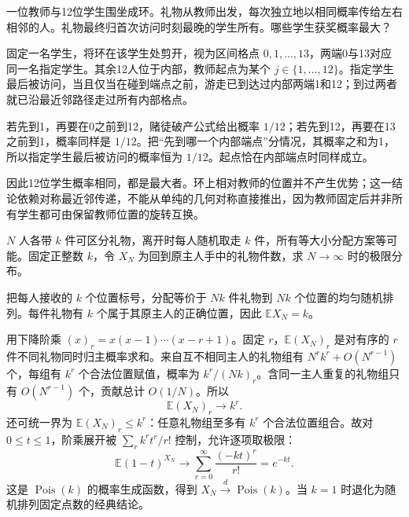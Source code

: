 \documentclass[UTF8,12pt,a4paper,fontset=fandol]{ctexbook}
\newcommand{\E}{\mathbb E}
\begin{document}
\begin{example}[原题2：圆周游走中最后被访问的人]\label{yau:2018-2}
一位教师与12位学生围坐成环。礼物从教师出发，每次独立地以相同概率传给左右相邻的人。礼物最终归首次访问时刻最晚的学生所有。哪些学生获奖概率最大？
\end{example}
\begin{solve}
固定一名学生，将环在该学生处剪开，视为区间格点 $0,1,\ldots,13$，两端0与13对应同一名指定学生。其余12人位于内部，教师起点为某个 $j\in\{1,\ldots,12\}$。指定学生最后被访问，当且仅当在碰到端点之前，游走已到达过内部两端1和12；到过两者就已沿最近邻路径走过所有内部格点。

若先到1，再要在0之前到12，赌徒破产公式给出概率 $1/12$；若先到12，再要在13之前到1，概率同样是 $1/12$。把“先到哪一个内部端点”分情况，其概率之和为1，所以指定学生最后被访问的概率恒为 $1/12$。起点恰在内部端点时同样成立。

因此12位学生概率相同，都是最大者。环上相对教师的位置并不产生优势；这一结论依赖对称最近邻传递，不能从单纯的几何对称直接推出，因为教师固定后并非所有学生都可由保留教师位置的旋转互换。
\end{solve}

\begin{example}[原题3：多人各带多件礼物的归还数]\label{yau:2018-3}
$N$ 人各带 $k$ 件可区分礼物，离开时每人随机取走 $k$ 件，所有等大小分配方案等可能。固定正整数 $k$，令 $X_N$ 为回到原主人手中的礼物件数，求 $N\to\infty$ 时的极限分布。
\end{example}
\begin{solve}
把每人接收的 $k$ 个位置标号，分配等价于 $Nk$ 件礼物到 $Nk$ 个位置的均匀随机排列。每件礼物有 $k$ 个属于其原主人的正确位置，因此 $\E X_N=k$。

用下降阶乘 $(x)_r=x(x-1)\cdots(x-r+1)$。固定 $r$，$\E(X_N)_r$ 是对有序的 $r$ 件不同礼物同时归主概率求和。来自互不相同主人的礼物组有 $N^rk^r+O(N^{r-1})$ 个，每组有 $k^r$ 个合法位置赋值，概率为 $k^r/(Nk)_r$。含同一主人重复的礼物组只有 $O(N^{r-1})$ 个，贡献总计 $O(1/N)$。所以
\[
\E(X_N)_r\longrightarrow k^r.
\]
还可统一界为 $\E(X_N)_r\le k^r$：任意礼物组至多有 $k^r$ 个合法位置组合。故对 $0\le t\le1$，阶乘展开被 $\sum_rk^rt^r/r!$ 控制，允许逐项取极限：
\[
\E(1-t)^{X_N}\longrightarrow\sum_{r=0}^\infty\frac{(-kt)^r}{r!}=e^{-kt}.
\]
这是 $\operatorname{Pois}(k)$ 的概率生成函数，得到 $X_N\xrightarrow d\operatorname{Pois}(k)$。当 $k=1$ 时退化为随机排列固定点数的经典结论。
\end{solve}
\end{document}
